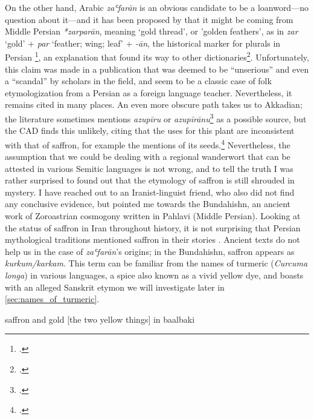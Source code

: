 On the other hand, Arabic \textit{zaʿfarān} is an obvious candidate to be a loanword---no question about it---and it has been proposed by \textcite{asbaghi_persische_1988} that it might be coming from Middle Persian \textit{*zarparān}, meaning `gold thread', or 'golden feathers', as in \textit{zar} `gold' + \textit{par} `feather; wing; leaf' + \textit{-ān}, the historical marker for plurals in Persian \footcite[65,98]{mackenzie_concise_1986}, an explanation that found its way to other dictionaries\footcite[cf.][safran]{ns}. Unfortunately, this claim was made in a publication that was deemed to be ``unserious'' \autocite[9]{ullmann_zur_1997} and even a ``scandal'' \autocite[315]{niehoff_review_1989} by scholars in the field, and seem to be a classic case of folk etymologization from a Persian as a foreign language teacher. Nevertheless, it remains cited in many places. An even more obscure path takes us to Akkadian; the literature sometimes mentions \textit{azupīru} or \textit{azupīrānu}\footcite[33]{black_concise_2000} as a possible source, but the \gls{CAD} finds this unlikely, citing that the uses for this plant are inconsistent with that of saffron, for example the mentions of its seeds.\footcite[531]{roth_assyrian_2004} 
Nevertheless, the assumption that we could be dealing with a regional \gls{wanderwort} that can be attested in various Semitic languages is not wrong, and to tell the truth I was rather surprised to found out that the etymology of saffron is still shrouded in mystery. I have reached out to an Iranist-linguist friend, who also did not find any conclusive evidence, but pointed me towards the Bundahishn, an ancient work of Zoroastrian cosmogony written in Pahlavi (Middle Persian). Looking at the status of saffron in Iran throughout history, it is not surprising that Persian mythological traditions mentioned saffron in their stories \autocite{sharifi_etymology_2010, golfam_saffron_2017}. Ancient texts do not help us in the case of \textit{zaʿfarān}'s origins; in the Bundahishn, saffron appears as \textit{kurkum/karkam}. This term can be familiar from the names of turmeric (\textit{Curcuma longa}) in various languages, a spice also known as a vivid yellow dye, and boasts with an alleged Sanskrit etymon we will investigate later in \cref{sec:names_of_turmeric}.

 saffron and gold [the two yellow things] in baalbaki






